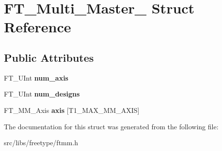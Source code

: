 \hypertarget{struct_f_t___multi___master__}{
\section{FT\_\-Multi\_\-Master\_\- Struct Reference}
\label{struct_f_t___multi___master__}
}
\subsection*{Public Attributes}
\begin{DoxyCompactItemize}
\item 
\hypertarget{struct_f_t___multi___master___a90a0ace4e40b91912259ad52fc86fb6f}{
FT\_\-UInt {\bfseries num\_\-axis}}
\label{struct_f_t___multi___master___a90a0ace4e40b91912259ad52fc86fb6f}

\item 
\hypertarget{struct_f_t___multi___master___a78b797ee560f4b00795a7dce9656178d}{
FT\_\-UInt {\bfseries num\_\-designs}}
\label{struct_f_t___multi___master___a78b797ee560f4b00795a7dce9656178d}

\item 
\hypertarget{struct_f_t___multi___master___a1eb062ff3b5ac245ab9421a46b349818}{
FT\_\-MM\_\-Axis {\bfseries axis} \mbox{[}T1\_\-MAX\_\-MM\_\-AXIS\mbox{]}}
\label{struct_f_t___multi___master___a1eb062ff3b5ac245ab9421a46b349818}

\end{DoxyCompactItemize}


The documentation for this struct was generated from the following file:\begin{DoxyCompactItemize}
\item 
src/libs/freetype/ftmm.h\end{DoxyCompactItemize}

